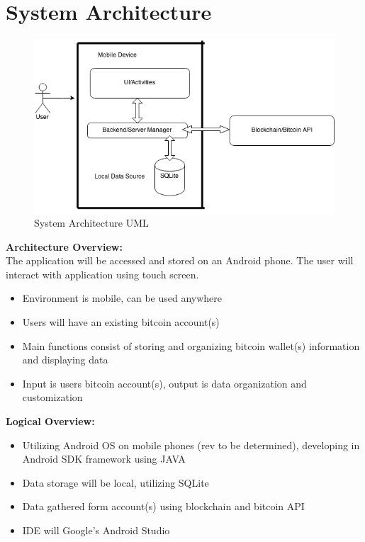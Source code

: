 \section{System Architecture}

\begin{figure}[H]
	\centering
	\includegraphics[scale=0.5]{../diagrams/systemArch.png}
	\caption{System Architecture UML}
\end{figure}

\textbf{Architecture Overview:}\\
The application will be accessed and stored on an Android phone.  The user will interact with application using touch screen.\\
\begin{itemize}
\item Environment is mobile, can be used anywhere 
\item Users will have an existing bitcoin account(s)
\item Main functions consist of storing and organizing bitcoin wallet(s) information and displaying data
\item Input is users bitcoin account(s), output is data organization and customization\\
\end{itemize}

\textbf{Logical Overview:}\\

\begin{itemize}
\item Utilizing Android OS on mobile phones (rev to be determined), developing in Android SDK framework using JAVA
\item Data storage will be local, utilizing SQLite
\item Data gathered form account(s) using blockchain and bitcoin API
\item IDE will Google's Android Studio\\
\end{itemize}
	
